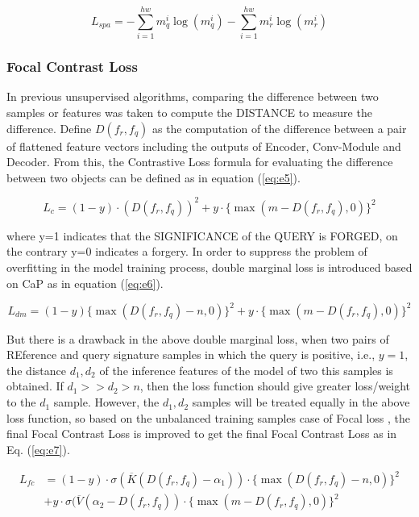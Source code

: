\documentclass{article}
\begin{document}
\begin{equation}\label{eq:e4}
	L_{spa}=-\sum_{i=1}^{hw} m_q^i \log(m_q^i ) - \sum_{i=1}^{hw} m_r^i \log(m_r^i)
\end{equation}


\subsubsection*{Focal Contrast Loss}

In previous unsupervised algorithms, comparing the difference between two samples or features was taken to compute the DISTANCE to measure the difference. Define $D(f_r, f_q)$ as the computation of the difference between a pair of flattened feature vectors including the outputs of Encoder, Conv-Module and Decoder. From this, the Contrastive Loss \cite{18} formula for evaluating the difference between two objects can be defined as in equation (\ref{eq:e5}).

\begin{equation}\label{eq:e5}
	L_c = (1 - y) \cdot (D(f_r, f_q))^2 + y \cdot \{\max(m-D(f_r, f_q), 0)\}^2
\end{equation}

where y=1 indicates that the SIGNIFICANCE of the QUERY is FORGED, on the contrary y=0 indicates a forgery. In order to suppress the problem of overfitting in the model training process, double marginal loss is introduced based on CaP \cite{19} as in equation (\ref{eq:e6}).

\begin{equation}\label{eq:e6}
	L_{dm}=(1 - y)\{\max(D(f_r, f_q) - n, 0) \}^2 + y \cdot \{\max(m - D(f_r, f_q), 0)\}^2
\end{equation}

But there is a drawback in the above double marginal loss, when two pairs of REference and query signature samples in which the query is positive, i.e., $y=1$, the distance $d_1,d_2$ of the inference features of the model of two this samples is obtained. If $d_1 >> d_2 > n$, then the loss function should give greater loss/weight to the $d_1$ sample. However, the $d_1, d_2$ samples will be treated equally in the above loss function, so based on the unbalanced training samples case of Focal loss \cite{20}, the final Focal Contrast Loss is improved to get the final Focal Contrast Loss as in Eq. (\ref{eq:e7}).

\begin{equation}\label{eq:e7}
	\begin{aligned}
		L_{fc} & = (1 - y) \cdot \sigma(\overline{K}(D(f_r,f_q) - \alpha_1 )) \cdot \{\max(D(f_r, f_q) - n,0) \}^2 \\
		       & + y \cdot \sigma(\overline{V} (\alpha_2 - D(f_r,f_q )) \cdot \{\max(m - D(f_r, f_q), 0)\}^2
	\end{aligned}
\end{equation}
\end{document}
